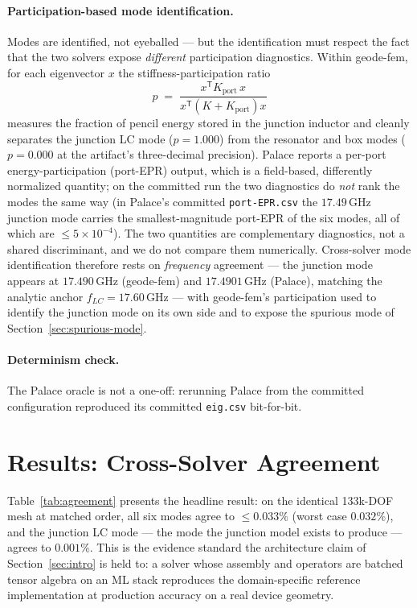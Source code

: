 \documentclass{anvil-paper}
\begin{document}
\paragraph{Participation-based mode identification.}
Modes are identified, not eyeballed --- but the identification must respect
the fact that the two solvers expose \emph{different} participation
diagnostics. Within geode-fem, for each eigenvector $x$ the
stiffness-participation ratio
\begin{equation}
  p \;=\; \frac{x^{\mathsf{T}} K_{\mathrm{port}}\, x}
               {x^{\mathsf{T}} \left(K + K_{\mathrm{port}}\right) x}
  \label{eq:participation}
\end{equation}
measures the fraction of pencil energy stored in the junction inductor and
cleanly separates the junction LC mode ($p = 1.000$) from the resonator and
box modes ($p = 0.000$ at the artifact's three-decimal precision). Palace
reports a per-port energy-participation (port-EPR) output, which is a
field-based, differently normalized quantity; on the committed run the two
diagnostics do \emph{not} rank the modes the same way (in Palace's
committed \texttt{port-EPR.csv} the $17.49$\,GHz junction mode carries the
smallest-magnitude port-EPR of the six modes, all of which are
$\leq 5\times10^{-4}$). The two quantities are complementary diagnostics,
not a shared discriminant, and we do not compare them numerically.
Cross-solver mode identification therefore rests on \emph{frequency}
agreement --- the junction mode appears at $17.490$\,GHz (geode-fem) and
$17.4901$\,GHz (Palace), matching the analytic anchor
$f_{LC} = 17.60$\,GHz --- with geode-fem's participation used to identify
the junction mode on its own side and to expose the spurious mode of
Section~\ref{sec:spurious-mode}.

\paragraph{Determinism check.}
The Palace oracle is not a one-off: rerunning Palace from the committed
configuration reproduced its committed \texttt{eig.csv} bit-for-bit.

\section{Results: Cross-Solver Agreement}
\label{sec:agreement}

Table~\ref{tab:agreement} presents the headline result: on the identical
133k-DOF mesh at matched order, all six modes agree to $\leq 0.033\%$
(worst case $0.032\%$), and the junction LC mode --- the mode the junction
model exists to produce --- agrees to $0.001\%$. This is the evidence
standard the architecture claim of Section~\ref{sec:intro} is held to: a
solver whose assembly and operators are batched tensor algebra on an ML
stack reproduces the domain-specific reference implementation at
production accuracy on a real device geometry.
\end{document}
